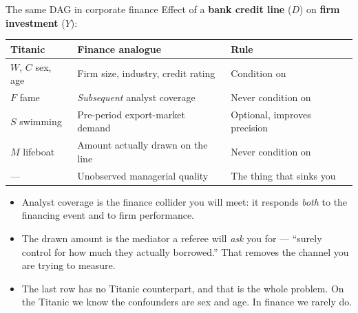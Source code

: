 \documentclass[
  11pt,
  ignorenonframetext,
  aspectratio=169,
]{beamer}
\providecommand{\tightlist}{%
  \setlength{\itemsep}{0pt}\setlength{\parskip}{0pt}}
\begin{document}
\begin{frame}{The same DAG in corporate finance}
\protect{}\label{the-same-dag-in-corporate-finance}
Effect of a \textbf{bank credit line} (\(D\)) on \textbf{firm
investment} (\(Y\)):

\begin{center}
\begin{tabular}{lll}
\toprule
Titanic & Finance analogue & Rule \\
\midrule
$W$, $C$ sex, age  & Firm size, industry, credit rating & Condition on \\
$F$ fame           & \emph{Subsequent} analyst coverage & Never condition on \\
$S$ swimming       & Pre-period export-market demand    & Optional, improves precision \\
$M$ lifeboat       & Amount actually drawn on the line  & Never condition on \\
--- & Unobserved managerial quality & The thing that sinks you \\
\bottomrule
\end{tabular}
\end{center}

\vspace{0.4em}

\begin{itemize}
\tightlist
\item
  Analyst coverage is the finance collider you will meet: it responds
  \emph{both} to the financing event and to firm performance.
\item
  The drawn amount is the mediator a referee will \emph{ask} you for ---
  ``surely control for how much they actually borrowed.'' That removes
  the channel you are trying to measure.
\item
  The last row has no Titanic counterpart, and that is the whole
  problem. On the Titanic we know the confounders are sex and age. In
  finance we rarely do.
\end{itemize}
\end{frame}
\end{document}
